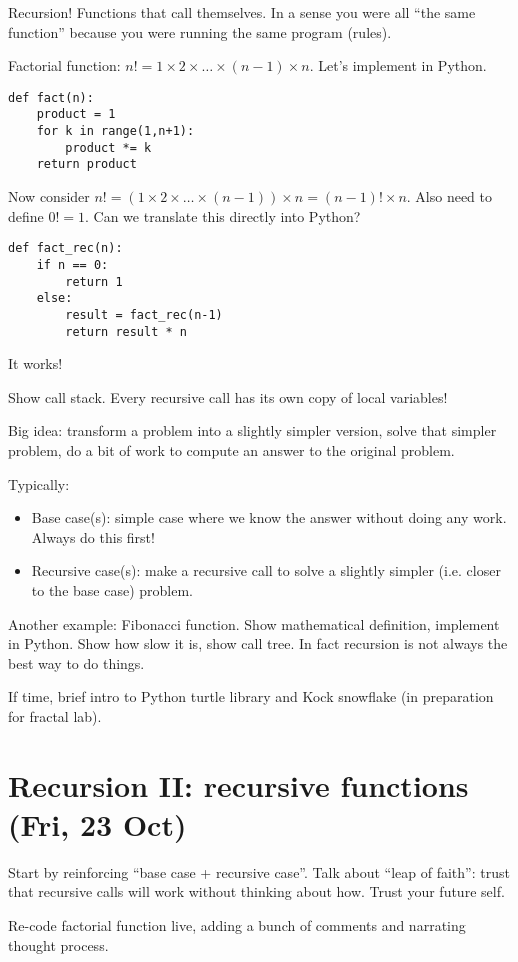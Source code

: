 \documentclass{article}
\begin{document}
Recursion!  Functions that call themselves.  In a sense you were all
``the same function'' because you were running the same program
(rules).

Factorial function: $n! = 1 \times 2 \times \dots \times (n-1) \times
n$.  Let's implement in Python.
\begin{verbatim}
def fact(n):
    product = 1
    for k in range(1,n+1):
        product *= k
    return product
\end{verbatim}
Now consider $n! = (1 \times 2 \times \dots \times (n-1)) \times n =
(n-1)! \times n$.  Also need to define $0! = 1$.  Can we translate
this directly into Python?
\begin{verbatim}
def fact_rec(n):
    if n == 0:
        return 1
    else:
        result = fact_rec(n-1)
        return result * n
\end{verbatim}
It works!

Show call stack.  Every recursive call has its own copy of local
variables!

Big idea: transform a problem into a slightly simpler version, solve
that simpler problem, do a bit of work to compute an answer to the
original problem.

Typically:
\begin{itemize}
\item Base case(s): simple case where we know the answer without doing
  any work.  Always do this first!
\item Recursive case(s): make a recursive call to solve a slightly
  simpler (i.e. closer to the base case) problem.
\end{itemize}

Another example: Fibonacci function.  Show mathematical definition,
implement in Python.  Show how slow it is, show call tree.  In fact
recursion is not always the best way to do things.

If time, brief intro to Python turtle library and Kock snowflake (in
preparation for fractal lab).

\section*{Recursion II: recursive functions (Fri, 23 Oct)}

Start by reinforcing ``base case + recursive case''.  Talk about
``leap of faith'': trust that recursive calls will work without
thinking about how.  Trust your future self.

Re-code factorial function live, adding a bunch of comments and
narrating thought process.
\end{document}
